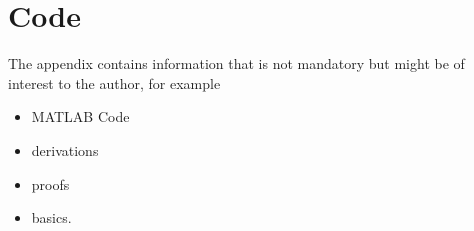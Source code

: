 \chapter{Code}
\label{cha:code}

The appendix contains information that is not mandatory but might be of interest to the author, for example
\begin{itemize}
	\item MATLAB Code
	\item derivations
	\item proofs
	\item basics.
\end{itemize}